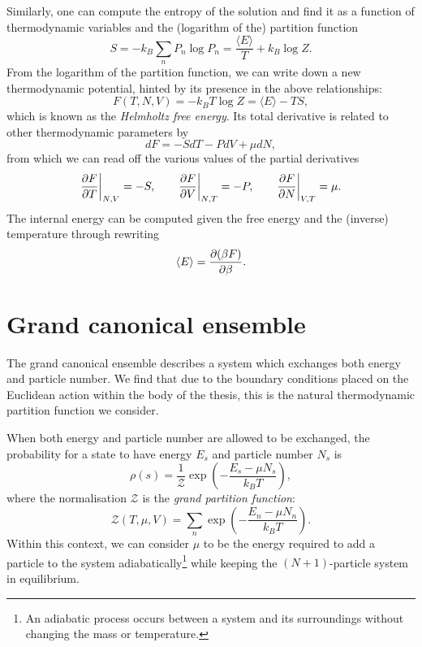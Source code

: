 Similarly, one can compute the entropy of the solution and find it  as a function of thermodynamic variables and the (logarithm of the) partition function
\begin{equation*}
	S = -k_B \sum_n P_n \log P_n = \frac{\langle E \rangle}{T} + k_B \log Z.
\end{equation*}
From the logarithm of the partition function, we can write down a new thermodynamic potential, hinted by its presence in the above relationships:
\begin{equation*}
	F(T,N,V) = - k_B T \log Z = \langle E \rangle - TS, 
\end{equation*}
which is known as the \emph{Helmholtz free energy}. Its total derivative is related to other thermodynamic parameters by
\begin{equation*}
	dF = - S dT - P dV + \mu dN,
\end{equation*}
from which we can read off the various values of the partial derivatives
\begin{equation*}
	\frac{\partial F}{\partial T} \bigg|_{N, V} = - S, \qquad \frac{\partial F}{\partial V} \bigg|_{N, T} = - P, \qquad \frac{\partial F}{\partial N} \bigg|_{V, T} = \mu.
\end{equation*}
The internal energy can be computed given the free energy and the (inverse) temperature through rewriting 
\begin{equation*}
	\langle E \rangle = \frac{\partial (\beta F)}{\partial \beta}.
\end{equation*}

\section{Grand canonical ensemble}

The grand canonical ensemble describes a system which exchanges both energy and particle number. We find that due to the boundary conditions placed on the Euclidean action within the body of the thesis, this is the natural thermodynamic partition function we consider. 

When both energy and particle number are allowed to be exchanged, the probability for a state to have energy $E_s$ and particle number $N_s$ is
\begin{equation*}
		\rho(s) = \frac{1}{\mathcal{Z}} \exp \left( - \frac{E_s - \mu N_s}{k_B T} \right),
\end{equation*}
where the normalisation $\mathcal{Z}$ is the \emph{grand partition function}:
\begin{equation*}
	\mathcal{Z}(T, \mu, V) = \sum_n \exp \left( - \frac{E_n - \mu N_n}{k_B T} \right).
\end{equation*}
Within this context, we can consider $\mu$ to be the energy required to add a particle to the system adiabatically\footnote{An adiabatic process occurs between a system and its surroundings without changing the mass or temperature.} while keeping the $(N + 1)$-particle system in equilibrium. 

